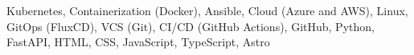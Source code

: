 Kubernetes, Containerization (Docker), Ansible, Cloud (Azure and AWS), Linux, GitOps (FluxCD), VCS (Git), CI/CD (GitHub Actions), GitHub, Python, FastAPI, HTML, CSS, JavaScript, TypeScript, Astro